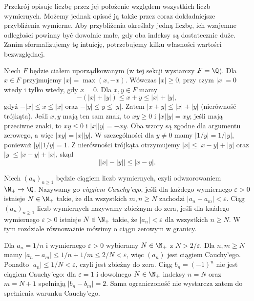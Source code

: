 Przekrój opisuje liczbę przez jej położenie względem wszystkich liczb wymiernych. Możemy jednak opisać ją także przez coraz dokładniejsze przybliżenia wymierne. Aby przybliżenia określały jedną liczbę, ich wzajemne odległości powinny być dowolnie małe, gdy oba indeksy są dostatecznie duże. Zanim sformalizujemy tę intuicję, potrzebujemy kilku własności wartości bezwzględnej.

Niech $F$ będzie ciałem uporządkowanym (w tej sekcji wystarczy $F=\Q$). Dla $x\in F$ przyjmujemy $|x|=\max(x,-x)$. Wówczas $|x|\ge0$, przy czym $|x|=0$ wtedy i tylko wtedy, gdy $x=0$. Dla $x,y\in F$ mamy
\[
 -(|x|+|y|)\le x+y\le |x|+|y|,
\]
gdyż $-|x|\le x\le |x|$ oraz $-|y|\le y\le |y|$. Zatem $|x+y|\le|x|+|y|$ (nierówność trójkąta).
Jeśli $x,y$ mają ten sam znak, to $xy\ge0$ i $|x||y|=xy$; jeśli mają przeciwne znaki, to $xy\le0$ i $|x||y|=-xy$. Oba wzory są zgodne dla argumentu zerowego, a więc $|xy|=|x||y|$. W szczególności dla $y\ne0$ mamy $|1/y|=1/|y|$, ponieważ $|y||1/y|=1$.
Z nierówności trójkąta otrzymujemy $|x|\le|x-y|+|y|$ oraz $|y|\le|x-y|+|x|$, skąd
\[
 \bigl||x|-|y|\bigr|\le|x-y|.
\]
\begin{definicja}
\label{ma1:def:rational-cauchy}
Niech $(a_n)_{n\ge1}$ będzie ciągiem liczb wymiernych, czyli odwzorowaniem $\N_+\to\Q$. Nazywamy go \emph{ciągiem Cauchy'ego}, jeśli dla każdego wymiernego $\varepsilon>0$ istnieje $N\in\N_+$ takie, że dla wszystkich $m,n\ge N$ zachodzi $|a_n-a_m|<\varepsilon$. Ciąg $(a_n)_{n\ge1}$ liczb wymiernych nazywamy zbieżnym do zera, jeśli dla każdego wymiernego $\varepsilon>0$ istnieje $N\in\N_+$ takie, że $|a_n|<\varepsilon$ dla wszystkich $n\ge N$. W tym rozdziale równoważnie mówimy o ciągu zerowym w granicy.
\end{definicja}
\begin{przyklad}
Dla $a_n=1/n$ i wymiernego $\varepsilon>0$ wybieramy $N\in\N_+$ z $N>2/\varepsilon$. Dla $n,m\ge N$ mamy $|a_n-a_m|\le1/n+1/m\le2/N<\varepsilon$, więc $(a_n)$ jest ciągiem Cauchy'ego. Ponadto $|a_n|\le1/N<\varepsilon$, czyli jest zbieżny do zera. Ciąg $b_n=(-1)^n$ nie jest ciągiem Cauchy'ego: dla $\varepsilon=1$ i dowolnego $N\in\N_+$ indeksy $n=N$ oraz $m=N+1$ spełniają $|b_n-b_m|=2$. Sama ograniczoność nie wystarcza zatem do spełnienia warunku Cauchy'ego.
\end{przyklad}


